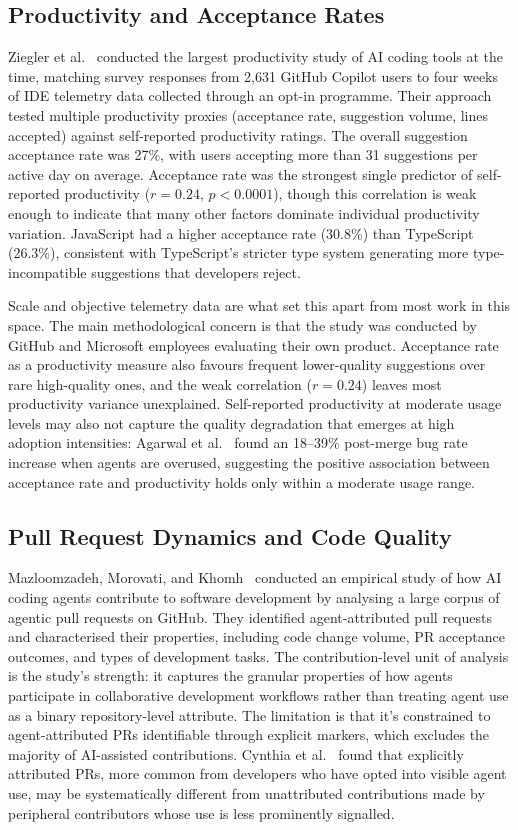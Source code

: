 \subsection{Productivity and Acceptance Rates}

Ziegler et al.~\cite{ziegler2022} conducted the largest productivity study of AI
coding tools at the time, matching survey responses from 2,631 GitHub Copilot users
to four weeks of IDE telemetry data collected through an opt-in programme. Their
approach tested multiple productivity proxies (acceptance rate, suggestion volume,
lines accepted) against self-reported productivity ratings. The overall suggestion
acceptance rate was 27\%, with users accepting more than 31 suggestions per active
day on average. Acceptance rate was the strongest single predictor of self-reported
productivity ($r = 0.24$, $p < 0.0001$), though this correlation is weak enough
to indicate that many other factors dominate individual productivity variation.
JavaScript had a higher acceptance rate (30.8\%) than TypeScript (26.3\%), consistent
with TypeScript's stricter type system generating more type-incompatible suggestions
that developers reject.

Scale and objective telemetry data are what set this apart from most work in this
space. The main methodological concern is that the study was conducted by GitHub and
Microsoft employees evaluating their own product. Acceptance rate as a productivity
measure also favours frequent lower-quality suggestions over rare high-quality ones,
and the weak correlation ($r = 0.24$) leaves most productivity variance unexplained.
Self-reported productivity at moderate usage levels may also not capture the quality
degradation that emerges at high adoption intensities: Agarwal et al.~\cite{agarwal2026}
found an 18--39\% post-merge bug rate increase when agents are overused, suggesting
the positive association between acceptance rate and productivity holds only within
a moderate usage range.

\subsection{Pull Request Dynamics and Code Quality}

Mazloomzadeh, Morovati, and Khomh~\cite{mazloomzadeh2026} conducted an empirical
study of how AI coding agents contribute to software development by analysing a
large corpus of agentic pull requests on GitHub. They identified agent-attributed
pull requests and characterised their properties, including code change volume, PR
acceptance outcomes, and types of development tasks. The contribution-level unit of
analysis is the study's strength: it captures the granular properties of how agents
participate in collaborative development workflows rather than treating agent use as
a binary repository-level attribute. The limitation is that it's constrained to
agent-attributed PRs identifiable through explicit markers, which excludes the
majority of AI-assisted contributions. Cynthia et al.~\cite{cynthia2026} found
that explicitly attributed PRs, more common from developers who have opted into
visible agent use, may be systematically different from unattributed contributions
made by peripheral contributors whose use is less prominently signalled.

